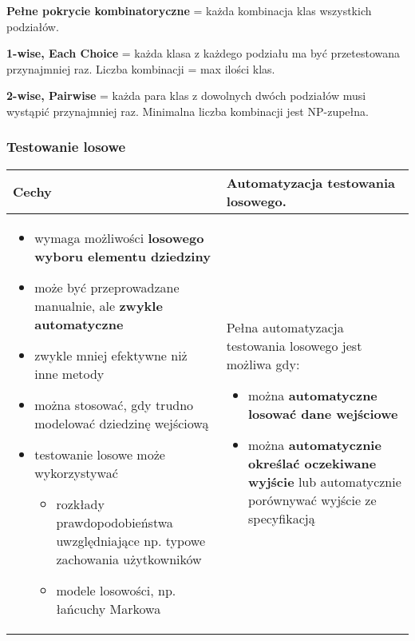 \documentclass[../main.tex]{subfiles}
\begin{document}
    \textbf{Pełne pokrycie kombinatoryczne} = każda kombinacja klas wszystkich podziałów.

    \textbf{1-wise, Each Choice} = każda klasa z każdego podziału ma być przetestowana przynajmniej raz.
    Liczba kombinacji = max ilości klas.

    \textbf{2-wise, Pairwise} = każda para klas z dowolnych dwóch podziałów musi wystąpić przynajmniej raz. Minimalna
    liczba kombinacji jest NP-zupełna.


    \subsubsection{Testowanie losowe}


    \begin{table}[H]
        \begin{center}
            \begin{tabular}{ p{8cm} | p{8cm}}
                \textbf{Cechy} &  \textbf{Automatyzacja testowania losowego}.\\
                \hline

                \begin{itemize}
                    \item wymaga możliwości \textbf{losowego wyboru elementu dziedziny}
                    \item może być przeprowadzane manualnie, ale \textbf{zwykle automatyczne}
                    \item zwykle mniej efektywne niż inne metody
                    \item można stosować, gdy trudno modelować dziedzinę wejściową
                    \item testowanie losowe może wykorzystywać
                    \begin{itemize}
                        \item rozkłady prawdopodobieństwa uwzględniające np. typowe
                        zachowania użytkowników
                        \item modele losowości, np. łańcuchy Markowa
                    \end{itemize}
                \end{itemize}

                &
                Pełna automatyzacja testowania losowego jest możliwa gdy:
                \begin{itemize}
                    \item można \textbf{automatyczne losować dane wejściowe}
                    \item można \textbf{automatycznie określać oczekiwane wyjście} lub automatycznie porównywać wyjście ze specyfikacją
                \end{itemize}



\end{tabular}
\end{center}
\end{table}
\end{document}
